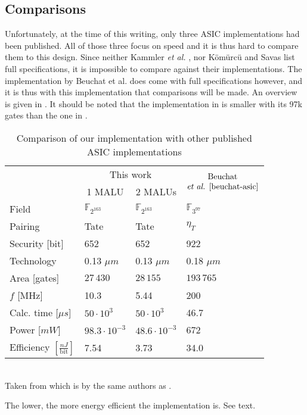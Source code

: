 \subsection{Comparisons}

Unfortunately, at the time of this writing, only three ASIC implementations had been published. All of those three focus on speed and it is thus hard to compare them to this design. Since neither Kammler \emph{et al.} \cite{kammler}, nor K\"om\"urc\"u and Savas \cite{savas} list full specifications, it is impossible to compare against their implementations. The implementation by Beuchat {et al.} \cite{beuchat-asic} does come with full specifications however, and it is thus with this implementation that comparisons will be made. An overview is given in . It should be noted that the implementation in \cite{kammler} is smaller with its 97k gates than the one in \cite{beuchat-asic}.

\begin{table}[h]
	\caption{Comparison of our implementation with other published ASIC implementations}
	\label{table-asic}
		\centering
		\begin{tabular}{llll}
			\toprule
			&	\multicolumn{2}{c}{This work}	& \multirow{2}{*}{$\begin{array}{@{}c@{}}\text{Beuchat}\\\text{\emph{et al.} \cite{beuchat-asic}}\end{array}$}\\
			\cmidrule(r){2-3}
			& \multicolumn{1}{c}{1 MALU} & \multicolumn{1}{c}{2 MALUs} &\\
	 		\midrule
			Field																				& $\mathbb{F}_{2^{163}}$	& $\mathbb{F}_{2^{163}}$	& $\mathbb{F}_{3^{97}}$\\
			Pairing																			& Tate							& Tate							& $\eta_T$\\
			Security [bit]\footnotemark[2]											& 652								& 652								& 922\\
			Technology																		& 0.13 $\mu m$					& 0.13 $\mu m$					& 0.18 $\mu m$\\
			Area [gates]																	& $27\,430$						& $28\,155$						& $193\,765$\\
			$f$ [MHz]																		& 10.3							& 5.44							& 200\\
			Calc. time [$\mu s$]															& $50 \cdot 10^3$				& $50 \cdot 10^3$				& 46.7\\
			Power [$mW$]																	& $98.3 \cdot 10^{-3}$		& $48.6 \cdot 10^{-3}$		& 672\\
			Efficiency $\left[ \frac{nJ}{\text{bit}}\right]$\footnotemark[3]	& 7.54						& 3.73							& 34.0\\
			\bottomrule		
		\end{tabular}
		\\[3pt]			
		\footnotesize \footnotemark[2] Taken from \cite{beuchat} which is by the same authors as \cite{beuchat-asic}.
		
		\footnotemark[3] The lower, the more energy efficient the implementation is. See text. 
\end{table}

